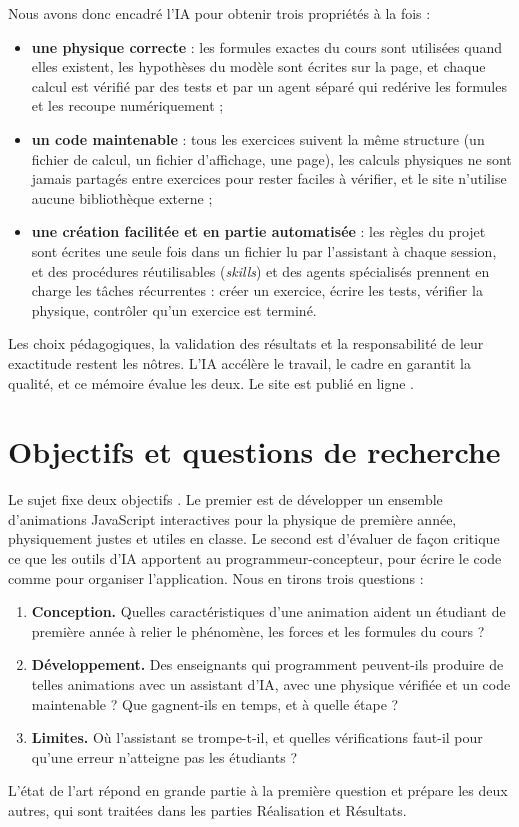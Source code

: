 Nous avons donc encadré l'IA pour obtenir trois propriétés à la fois :
\begin{itemize}
  \item \textbf{une physique correcte} : les formules exactes du cours sont
        utilisées quand elles existent, les hypothèses du modèle sont écrites
        sur la page, et chaque calcul est vérifié par des tests et par un
        agent séparé qui redérive les formules et les recoupe numériquement ;
  \item \textbf{un code maintenable} : tous les exercices suivent la même
        structure (un fichier de calcul, un fichier d'affichage, une page),
        les calculs physiques ne sont jamais partagés entre exercices pour
        rester faciles à vérifier, et le site n'utilise aucune bibliothèque
        externe ;
  \item \textbf{une création facilitée et en partie automatisée} : les
        règles du projet sont écrites une seule fois dans un fichier lu par
        l'assistant à chaque session, et des procédures réutilisables
        (\emph{skills}) et des agents spécialisés prennent en charge les
        tâches récurrentes : créer un exercice, écrire les tests, vérifier
        la physique, contrôler qu'un exercice est terminé.
\end{itemize}
Les choix pédagogiques, la validation des résultats et la responsabilité de
leur exactitude restent les nôtres. L'IA accélère le travail, le cadre en
garantit la qualité, et ce mémoire évalue les deux. Le site est publié en
ligne \cite{site_physicsviz}.

\section{Objectifs et questions de recherche}

Le sujet fixe deux objectifs \cite{sujet_memoire}. Le premier est de
développer un ensemble d'animations JavaScript interactives pour la physique
de première année, physiquement justes et utiles en classe. Le second est
d'évaluer de façon critique ce que les outils d'IA apportent au
programmeur-concepteur, pour écrire le code comme pour organiser
l'application. Nous en tirons trois questions :
\begin{enumerate}
  \item \textbf{Conception.} Quelles caractéristiques d'une animation aident
        un étudiant de première année à relier le phénomène, les forces et
        les formules du cours ?
  \item \textbf{Développement.} Des enseignants qui programment peuvent-ils
        produire de telles animations avec un assistant d'IA, avec une
        physique vérifiée et un code maintenable ? Que gagnent-ils en temps,
        et à quelle étape ?
  \item \textbf{Limites.} Où l'assistant se trompe-t-il, et quelles
        vérifications faut-il pour qu'une erreur n'atteigne pas les
        étudiants ?
\end{enumerate}
L'état de l'art répond en grande partie à la première question et prépare les
deux autres, qui sont traitées dans les parties Réalisation et Résultats.

